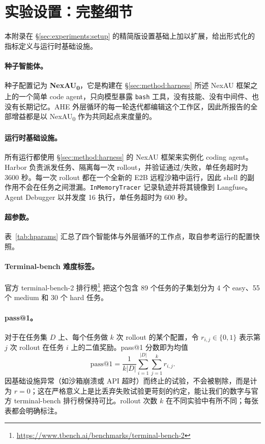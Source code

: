 \section{实验设置：完整细节}
\label{app:setup}

本附录在 \S\ref{sec:experiments:setup} 的精简版设置基础上加以扩展，给出形式化的指标定义与运行时基础设施。

\paragraph{种子智能体。}
种子配置记为 \textbf{NexAU\textsubscript{0}}，它是构建在 \S\ref{sec:method:harness} 所述 NexAU 框架之上的一个简单 code agent，只向模型暴露 \texttt{bash} 工具，没有技能、没有中间件、也没有长期记忆。AHE 外层循环的每一轮迭代都编辑这个工作区，因此所报告的全部增益都是以 NexAU\textsubscript{0} 作为共同起点来度量的。

\paragraph{运行时基础设施。}
所有运行都使用 \S\ref{sec:method:harness} 的 NexAU 框架来实例化 coding agent。Harbor 负责派发任务、隔离每一次 rollout，并验证通过/失败，单任务超时为 3600 秒。每一次 rollout 都在一个全新的 E2B 远程沙箱中运行，因此 shell 的副作用不会在任务之间泄漏。\texttt{InMemoryTracer} 记录轨迹并将其镜像到 Langfuse。Agent Debugger 以并发度 16 执行，单任务超时为 600 秒。

\paragraph{超参数。}
表~\ref{tab:hparams} 汇总了四个智能体与外层循环的工作点，取自参考运行的配置快照。



\paragraph{Terminal-bench 难度标签。}
官方 terminal-bench-2 排行榜\footnote{\url{https://www.tbench.ai/benchmarks/terminal-bench-2}} 把这个包含 89 个任务的子集划分为 4 个 easy、55 个 medium 和 30 个 hard 任务。

\paragraph{pass@1。}
对于在任务集 $D$ 上、每个任务做 $k$ 次 rollout 的某个配置，令 $r_{i,j} \in \{0, 1\}$ 表示第 $j$ 次 rollout 在任务 $i$ 上的二值奖励。pass@1 分数即为均值
\begin{equation}
    \mathrm{pass@1} = \frac{1}{k|D|} \sum_{i=1}^{|D|} \sum_{j=1}^{k} r_{i,j}.
\end{equation}
因基础设施异常（如沙箱崩溃或 API 超时）而终止的试验，不会被剔除，而是计为 $r=0$；这在严格意义上是比丢弃失败试验更苛刻的约定，能让我们的数字与官方 terminal-bench 排行榜保持可比。rollout 次数 $k$ 在不同实验中有所不同；每张表都会明确标注。

